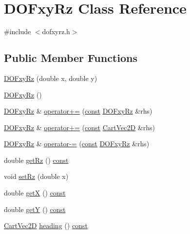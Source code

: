 \hypertarget{class_d_o_fxy_rz}{}\section{D\+O\+Fxy\+Rz Class Reference}
\label{class_d_o_fxy_rz}


{\ttfamily \#include $<$dofxyrz.\+h$>$}

\subsection*{Public Member Functions}
\begin{DoxyCompactItemize}
\item 
\hyperlink{class_d_o_fxy_rz_a6f464ff9fa12b2d66c93415f079a003d}{D\+O\+Fxy\+Rz} (double x, double y)
\item 
\hyperlink{class_d_o_fxy_rz_afa374e4dff3b3a5916cf545b16f07596}{D\+O\+Fxy\+Rz} ()
\item 
\hyperlink{class_d_o_fxy_rz}{D\+O\+Fxy\+Rz} \& \hyperlink{class_d_o_fxy_rz_a043e442de5d6442ed7e582b9d5507b82}{operator+=} (\hyperlink{functions__c_8js_afacfd9c985d225bb07483b887a801b6f}{const} \hyperlink{class_d_o_fxy_rz}{D\+O\+Fxy\+Rz} \&rhs)
\item 
\hyperlink{class_d_o_fxy_rz}{D\+O\+Fxy\+Rz} \& \hyperlink{class_d_o_fxy_rz_a082af42b93a681708dec738e844356d8}{operator+=} (\hyperlink{functions__c_8js_afacfd9c985d225bb07483b887a801b6f}{const} \hyperlink{class_cart_vec2_d}{Cart\+Vec2D} \&rhs)
\item 
\hyperlink{class_d_o_fxy_rz}{D\+O\+Fxy\+Rz} \& \hyperlink{class_d_o_fxy_rz_ac6c8ca46b06727c79aa454ccbeb89b19}{operator-\/=} (\hyperlink{functions__c_8js_afacfd9c985d225bb07483b887a801b6f}{const} \hyperlink{class_d_o_fxy_rz}{D\+O\+Fxy\+Rz} \&rhs)
\item 
double \hyperlink{class_d_o_fxy_rz_ac82d85d1f14b1ee58df06cf3b3d15c17}{get\+Rz} () \hyperlink{functions__c_8js_afacfd9c985d225bb07483b887a801b6f}{const} 
\item 
void \hyperlink{class_d_o_fxy_rz_a1d9e60f0b34ead75b5bd08a18a3d3bc3}{set\+Rz} (double x)
\item 
double \hyperlink{class_d_o_fxy_rz_a9f40a00c3ac6b7d0bb5e6dff8e5505fe}{getX} () \hyperlink{functions__c_8js_afacfd9c985d225bb07483b887a801b6f}{const} 
\item 
double \hyperlink{class_d_o_fxy_rz_a9e61abd80baaefc6969d2d5264840365}{getY} () \hyperlink{functions__c_8js_afacfd9c985d225bb07483b887a801b6f}{const} 
\item 
\hyperlink{class_cart_vec2_d}{Cart\+Vec2D} \hyperlink{class_d_o_fxy_rz_a6b53b0cecd56e675e5f48e34a68d11e4}{heading} () \hyperlink{functions__c_8js_afacfd9c985d225bb07483b887a801b6f}{const} 
\end{DoxyCompactItemize}
